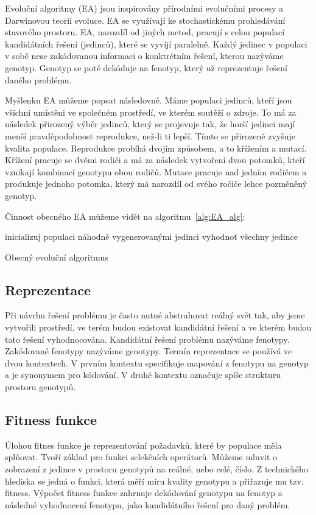 Evoluční algoritmy (EA) jsou inspirovány přírodními evolučními procesy a Darwinovou teorií evoluce.
EA se využívají ke stochastickému prohledávání stavového prostoru.
EA, narozdíl od jiných metod, pracují s celou populací kandidátních řešení (jedinců), které se vyvíjí paralelně.
Každý jedinec v populaci v sobě nese zakódovanou informaci o konktrétním řešení, kterou nazýváme genotyp.
Genotyp se poté dekóduje na fenotyp, který už reprezentuje řešení daného problému.

Myšlenku EA můžeme popsat následovně.
Máme populaci jedinců, kteří jsou všichni umístěni ve společném prostředí, ve kterém soutěží o zdroje.
To má za následek přirozený výběr jedinců, který se projevuje tak, že horší jedinci mají menší pravděpodobnost reprodukce, než-li ti lepší.
Tímto se přirozeně zvyšuje kvalita populace.
Reprodukce probíhá dvojím způsobem, a to křížením a mutací.
Křížení pracuje se dvěmi rodiči a má za následek vytvoření dvou potomků, kteří vznikají kombinací genotypu obou rodičů.
Mutace pracuje nad jedním rodičem a produkuje jednoho potomka, který má narozdíl od svého ročiče lehce pozměněný genotyp.

Činnost obecného EA můžeme vidět na algoritmu~\ref{alg:EA_alg}:


\begin{algorithm}[H]
    inicializuj populaci náhodně vygenerovanými jedinci\;
    vyhodnoť všechny jedince\;
    \caption{Obecný evoluční algoritmus}
    \label{alg:EA_alg}
\end{algorithm}

\subsection{Reprezentace}
Při návrhu řešení problému je často nutné abstrahovat reálný svět tak, aby jsme vytvořili prostředí, ve terém budou existovat kandidátní řešení a ve kterém budou tato řešení vyhodnocována.
Kandidátní řešení problému nazýváme fenotypy.
Zakódované fenotypy nazýváme genotypy.
Termín reprezentace se používá ve dvou kontextech.
V prvním kontextu specifikuje mapování z fenotypu na genotyp a je synonymem pro kódování.
V druhé kontextu označuje spíše strukturu prostoru genotypů.

\subsection{Fitness funkce}
Úlohou fitnes funkce je reprezentování požadavků, které by populace měla splňovat.
Tvoří základ pro funkci selekčních operátorů.
Můžeme mluvit o zobrazení z jedince v prostoru genotypů na reálné, nebo celé, číslo.
Z technického hlediska se jedná o funkci, která měří míru kvality genotypu a přiřazuje mu tzv. fitness.
Výpočet fitness funkce zahrnuje dekódování genotypu na fenotyp a následné vyhodnocení fenotypu, jako kandidátního řešení pro daný problém.

